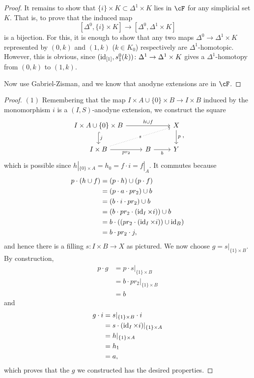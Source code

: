 \documentclass[a4paper,11pt,openany]{scrartcl}
\begin{document}
\begin{proof}
It remains to show that $\{i\}\times K\subset\Delta^1\times K$ lies in $\cF$ for any simplicial set $K$. That is, to prove that the induced map
\[
[\Delta^0,\{i\}\times K]\to[\Delta^0,\Delta^1\times K]
\]
is a bijection. For this, it is enough to show that any two maps $\Delta^0\to\Delta^1\times K$ represented by $(0,k)$ and $(1,k)$ ($k\in K_0$) respectively are $\Delta^1$-homotopic. However, this is obvious, since $(\operatorname{id}_{[1]},s^0_1(k))\colon\Delta^1\to\Delta^1\times K$ gives a $\Delta^1$-homotopy from $(0,k)$ to $(1,k)$.

Now use Gabriel-Zisman, and we know that anodyne extensions are in $\cF$.
\end{proof}

\begin{proof}
    $(1)$ Remembering that the map $I\times A\cup\{0\}\times B\rightarrow
    I\times B$ induced by the monomorphism $i$ is a $(I,S)$-anodyne extension,
    we construct the square
    \[\begin{tikzcd}
        {I\times A\cup\{0\}\times B} && X \\
        {I\times B} & B & Y
        \arrow["{h\cup f}", from=1-1, to=1-3]
        \arrow["{j}", hook, from=1-1, to=2-1]
        \arrow["{pr_2}"', from=2-1, to=2-2]
        \arrow["b"', from=2-2, to=2-3]
        \arrow["p", from=1-3, to=2-3]
        \arrow["s"{description}, dotted, from=2-1, to=1-3]
    \end{tikzcd},\]
    which is possible since $h|_{\{0\}\times A}=h_0=f\cdot i=f|_A$. It commutes
    because
    \begin{align*}
        p\cdot(h\cup f) &=(p\cdot h)\cup (p\cdot f) \\
        &=(p\cdot a\cdot pr_2)\cup b \\
        &=(b\cdot i\cdot pr_2)\cup b \\
        &=(b\cdot pr_2\cdot(\operatorname{id}_I\times i))\cup b \\
        &=b\cdot((pr_2\cdot(\operatorname{id}_I\times i))\cup\operatorname{id}_B) \\
        &=b\cdot pr_2\cdot j,
    \end{align*}
    and hence there is a filling $s\colon I\times B\rightarrow X$ as pictured.
    We now choose $g=s|_{\{1\}\times B}$. By construction,
    \begin{align*}
        p\cdot g &=p\cdot s|_{\{1\}\times B} \\
        &=b\cdot pr_2|_{\{1\}\times B} \\
        &=b
    \end{align*}
    and
    \begin{align*}
        g\cdot i &=s|_{\{1\}\times B}\cdot i \\
        &=s\cdot(\operatorname{id}_I\times i)|_{\{1\}\times A} \\
        &=h|_{\{1\}\times A} \\
        &=h_1 \\
        &=a,
    \end{align*}
    which proves that the $g$ we constructed has the desired properties.


\end{proof}
\end{document}
